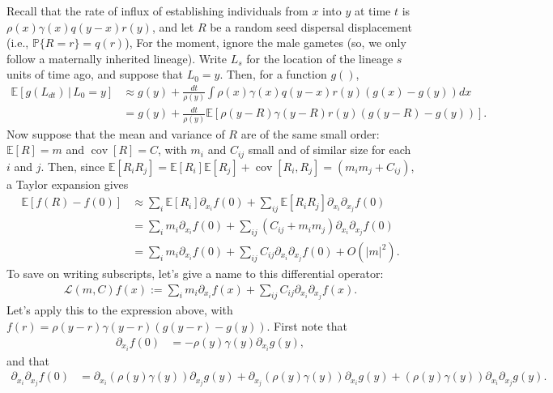 \documentclass{article}
\renewcommand{\P}{\mathbb{P}}
\newcommand{\E}{\mathbb{E}}
\DeclareMathOperator{\cov}{cov}
\newcommand{\given}{\,\vert\,}
\newcommand{\diffop}{\mathcal{L}}
\begin{document}
Recall that the rate of influx of establishing individuals from $x$ into $y$ at time $t$ is
$\rho(x) \gamma(x) q(y - x) r(y)$,
and let $R$ be a random seed dispersal displacement (i.e., $\P\{R = r\} = q(r)$),
For the moment, ignore the male gametes (so, we only follow a maternally inherited lineage).
Write $L_s$ for the location of the lineage $s$ units of time ago,
and suppose that $L_0 = y$.
Then, for a function $g( )$,
\begin{align*}
    \E[g(L_{dt}) \given L_0 = y]
    &\approx
        g(y) 
        + \frac{dt}{\rho(y)} \int \rho(x) \gamma(x) q(y - x) r(y) \left(g(x) - g(y)\right) dx \\
    &=
        g(y) 
        + \frac{dt}{\rho(y)} \E\left[ \rho(y - R) \gamma(y - R) r(y) \left(g(y - R) - g(y)\right) \right] .
\end{align*}
Now suppose that the mean and variance of $R$ are of the same small order:
$\E[R] = m$ and $\cov[R] = C$,
with $m_i$ and $C_{ij}$ small and of similar size for each $i$ and $j$.
Then, since $\E[R_i R_j] = \E[R_i] \E[R_j] + \cov[R_i, R_j] = (m_i m_j + C_{ij})$,
a Taylor expansion gives
\begin{align*}
    \E[f(R) - f(0)]
    &\approx
        \sum_i \E[R_i] \partial_{x_i} f(0) 
            + \sum_{ij} \E[R_i R_j] \partial_{x_i} \partial_{x_j} f(0) \\
    &=
        \sum_i m_i \partial_{x_i} f(0) 
            + \sum_{ij} \left(C_{ij} + m_i m_j\right) \partial_{x_i} \partial_{x_j} f(0) \\
    &=
        \sum_i m_i \partial_{x_i} f(0) 
            + \sum_{ij} C_{ij} \partial_{x_i} \partial_{x_j} f(0) + O(|m|^2) .
\end{align*}
To save on writing subscripts, let's give a name to this differential operator:
\begin{align*}
    \diffop(m, C) f(x) 
    :=
        \sum_i m_i \partial_{x_i} f(x) 
            + \sum_{ij} C_{ij} \partial_{x_i} \partial_{x_j} f(x) .
\end{align*}
Let's apply this to the expression above,
with $f(r) = \rho(y - r) \gamma(y - r) (g(y - r) - g(y))$.
First note that
\begin{align*}
    \partial_{x_i} f(0)
    &= - \rho(y) \gamma(y) \partial_{x_i} g(y),
\end{align*}
and that
\begin{align*}
    \partial_{x_i} \partial_{x_j} f(0)
    &= \partial_{x_i} \left(\rho(y) \gamma(y)\right) \partial_{x_j} g(y)
       + \partial_{x_j} \left(\rho(y) \gamma(y)\right) \partial_{x_i} g(y)
       + \left(\rho(y) \gamma(y)\right) \partial_{x_i} \partial_{x_j} g(y) .
\end{align*}
\end{document}
